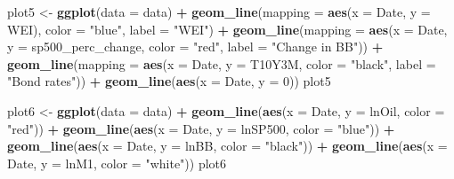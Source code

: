 \documentclass[]{article}
\newenvironment{Shaded}{\begin{snugshade}}{\end{snugshade}}
\newcommand{\KeywordTok}[1]{\textcolor[rgb]{0.13,0.29,0.53}{\textbf{#1}}}
\newcommand{\DataTypeTok}[1]{\textcolor[rgb]{0.13,0.29,0.53}{#1}}
\newcommand{\DecValTok}[1]{\textcolor[rgb]{0.00,0.00,0.81}{#1}}
\newcommand{\StringTok}[1]{\textcolor[rgb]{0.31,0.60,0.02}{#1}}
\newcommand{\OperatorTok}[1]{\textcolor[rgb]{0.81,0.36,0.00}{\textbf{#1}}}
\newcommand{\NormalTok}[1]{#1}
\begin{document}
\begin{Shaded}
\begin{Highlighting}[]
\NormalTok{plot5 <-}\StringTok{ }\KeywordTok{ggplot}\NormalTok{(}\DataTypeTok{data =}\NormalTok{ data) }\OperatorTok{+}
\StringTok{  }\KeywordTok{geom_line}\NormalTok{(}\DataTypeTok{mapping =} \KeywordTok{aes}\NormalTok{(}\DataTypeTok{x =}\NormalTok{ Date, }\DataTypeTok{y =}\NormalTok{ WEI), }\DataTypeTok{color =} \StringTok{"blue"}\NormalTok{, }\DataTypeTok{label =} \StringTok{"WEI"}\NormalTok{) }\OperatorTok{+}
\StringTok{  }\KeywordTok{geom_line}\NormalTok{(}\DataTypeTok{mapping =} \KeywordTok{aes}\NormalTok{(}\DataTypeTok{x =}\NormalTok{ Date, }\DataTypeTok{y =}\NormalTok{ sp500_perc_change, }
                          \DataTypeTok{color =} \StringTok{"red"}\NormalTok{, }\DataTypeTok{label =} \StringTok{"Change in BB"}\NormalTok{)) }\OperatorTok{+}
\StringTok{  }\KeywordTok{geom_line}\NormalTok{(}\DataTypeTok{mapping =} \KeywordTok{aes}\NormalTok{(}\DataTypeTok{x =}\NormalTok{ Date, }\DataTypeTok{y =}\NormalTok{ T10Y3M, }\DataTypeTok{color =} \StringTok{"black"}\NormalTok{, }\DataTypeTok{label =} \StringTok{"Bond rates"}\NormalTok{)) }\OperatorTok{+}\StringTok{ }
\StringTok{  }\KeywordTok{geom_line}\NormalTok{(}\KeywordTok{aes}\NormalTok{(}\DataTypeTok{x =}\NormalTok{ Date, }\DataTypeTok{y =} \DecValTok{0}\NormalTok{))}
\NormalTok{plot5}

\NormalTok{plot6 <-}\StringTok{ }\KeywordTok{ggplot}\NormalTok{(}\DataTypeTok{data =}\NormalTok{ data) }\OperatorTok{+}
\StringTok{  }\KeywordTok{geom_line}\NormalTok{(}\KeywordTok{aes}\NormalTok{(}\DataTypeTok{x =}\NormalTok{ Date, }\DataTypeTok{y =}\NormalTok{ lnOil, }\DataTypeTok{color =} \StringTok{"red"}\NormalTok{)) }\OperatorTok{+}
\StringTok{  }\KeywordTok{geom_line}\NormalTok{(}\KeywordTok{aes}\NormalTok{(}\DataTypeTok{x =}\NormalTok{ Date, }\DataTypeTok{y =}\NormalTok{ lnSP500, }\DataTypeTok{color =} \StringTok{"blue"}\NormalTok{)) }\OperatorTok{+}
\StringTok{  }\KeywordTok{geom_line}\NormalTok{(}\KeywordTok{aes}\NormalTok{(}\DataTypeTok{x =}\NormalTok{ Date, }\DataTypeTok{y =}\NormalTok{ lnBB, }\DataTypeTok{color =} \StringTok{"black"}\NormalTok{)) }\OperatorTok{+}
\StringTok{  }\KeywordTok{geom_line}\NormalTok{(}\KeywordTok{aes}\NormalTok{(}\DataTypeTok{x =}\NormalTok{ Date, }\DataTypeTok{y =}\NormalTok{ lnM1, }\DataTypeTok{color =} \StringTok{"white"}\NormalTok{))}
\NormalTok{plot6}


\end{Highlighting}
\end{Shaded}
\end{document}
